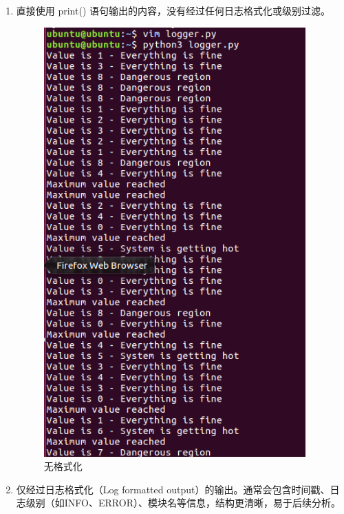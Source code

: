 \documentclass[UTF8]{ctexart}
\begin{document}
\begin{enumerate}
    \item 直接使用 print() 语句输出的内容，没有经过任何日志格式化或级别过滤。
    \begin{figure}[H]
    \centering
    \includegraphics[width=0.95\textwidth]{picture/直接打印.png}
    \caption{无格式化}
\end{figure}
    \item 仅经过日志格式化（Log formatted output）的输出。通常会包含时间戳、日志级别（如INFO、ERROR）、模块名等信息，结构更清晰，易于后续分析。
    \begin{figure}[H]
    \centering

\end{figure}
\end{enumerate}
\end{document}
